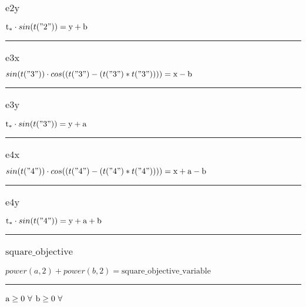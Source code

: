\documentclass[11pt]{article}
\begin{document}
\subsubsection*{\begin{math}\text{e2y}\end{math}}
\begin{math}
\text{t}_{*} \cdot  sin(t("2"))  = \text{y} + \text{b}
\end{math}
\vspace{5pt}
\hrule
\subsubsection*{\begin{math}\text{e3x}\end{math}}
\begin{math}
 sin(t("3"))  \cdot  cos((t("3") - (t("3") * t("3"))))  = \text{x} - \text{b}
\end{math}
\vspace{5pt}
\hrule
\subsubsection*{\begin{math}\text{e3y}\end{math}}
\begin{math}
\text{t}_{*} \cdot  sin(t("3"))  = \text{y} + \text{a}
\end{math}
\vspace{5pt}
\hrule
\subsubsection*{\begin{math}\text{e4x}\end{math}}
\begin{math}
 sin(t("4"))  \cdot  cos((t("4") - (t("4") * t("4"))))  = \text{x} + \text{a} - \text{b}
\end{math}
\vspace{5pt}
\hrule
\subsubsection*{\begin{math}\text{e4y}\end{math}}
\begin{math}
\text{t}_{*} \cdot  sin(t("4"))  = \text{y} + \text{a} + \text{b}
\end{math}
\vspace{5pt}
\hrule
\subsubsection*{\begin{math}\text{square\_objective}\end{math}}
\begin{math}
 power(a,2)  +  power(b,2)  = \text{square\_objective\_variable}
\end{math}
\vspace{5pt}
\hrule
\bigskip
\begin{math}\text{a}\geq 0 ~ \forall \\\end{math}
\begin{math}\text{b}\geq 0 ~ \forall \\\end{math}
\end{document}
